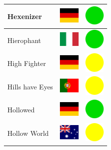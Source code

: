 \documentclass[12pt, a4paper, twoside]{report}
\begin{document}
\begin{center}
\begin{longtable}{|p{5cm}|p{2cm}|p{2cm}|}
 Hexenizer                                                  & \includegraphics[width=1cm]{../4x3/de} &   \includegraphics[width=1cm]{../likes/y} \\ \hline
 Hierophant                                                 & \includegraphics[width=1cm]{../4x3/it} &   \includegraphics[width=1cm]{../likes/y} \\ \hline
 High Fighter                                               & \includegraphics[width=1cm]{../4x3/de} &   \includegraphics[width=1cm]{../likes/m} \\ \hline
 Hills have Eyes                                            & \includegraphics[width=1cm]{../4x3/pt} &   \includegraphics[width=1cm]{../likes/m} \\ \hline
 Hollowed                                                   & \includegraphics[width=1cm]{../4x3/de} &   \includegraphics[width=1cm]{../likes/y} \\ \hline
 Hollow World                                               & \includegraphics[width=1cm]{../4x3/au} &   \includegraphics[width=1cm]{../likes/m} \\ \hline

\end{longtable}
\end{center}
\end{document}
